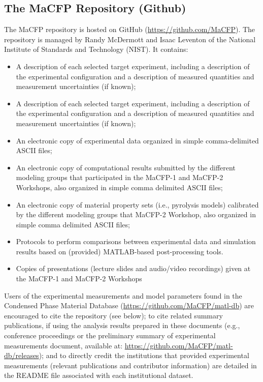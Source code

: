 \documentclass[12pt]{article}
\begin{document}
\subsection{The MaCFP Repository (Github)}
The MaCFP repository is hosted on GitHub (\url{https://github.com/MaCFP}). The repository is managed by Randy McDermott and Isaac Leventon of the National Institute of Standards and Technology (NIST). It contains: 
\begin{itemize}[noitemsep]
 \item A description of each selected target experiment, including a description of the experimental configuration and a description of measured quantities and measurement uncertainties (if known); 
  \item A description of each selected target experiment, including a description of the experimental configuration and a description of measured quantities and measurement uncertainties (if known);  
 \item An electronic copy of experimental data organized in simple comma-delimited ASCII files; 
 \item An electronic copy of computational results submitted by the different modeling groups that participated in the MaCFP-1 and MaCFP-2 Workshops, also organized in simple comma delimited ASCII files; 
  \item An electronic copy of material property sets (i.e., pyrolysis models) calibrated by the different modeling groups that MaCFP-2 Workshop, also organized in simple comma delimited ASCII files; 
 \item Protocols to perform comparisons between experimental data and simulation results based on (provided) MATLAB-based post-processing tools. 
 \item Copies of presentations (lecture slides and audio/video recordings) given at the MaCFP-1 and MaCFP-2 Workshops
\end{itemize}

Users of the experimental measurements and model parameters found in the Condensed Phase Material Database (\url{https://github.com/MaCFP/matl-db}) are encouraged to cite the repository (see below); to cite related summary publications, if using the analysis results prepared in these documents (e.g., conference proceedings \cite{brown2018proceedings} or the preliminary summary of experimental measurements document, available at: \url{https://github.com/MaCFP/matl-db/releases}); and to directly credit the institutions that provided experimental measurements (relevant publications and contributor information) are detailed in the README file associated with each institutional dataset. 
\end{document}
